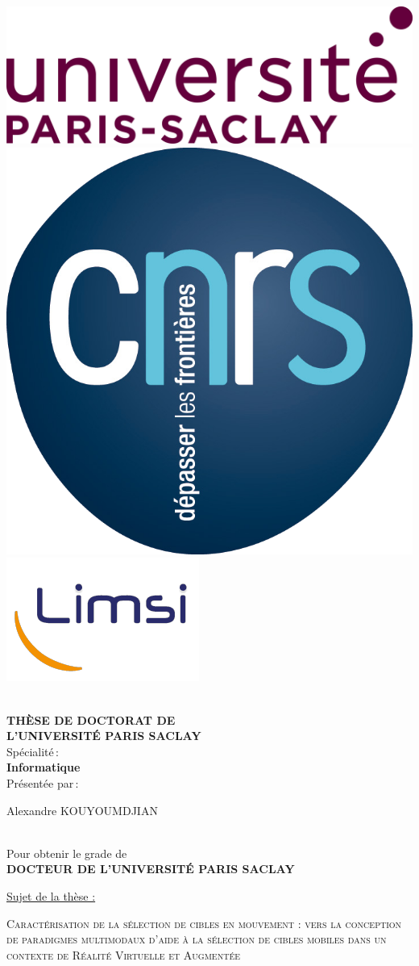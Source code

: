 \begin{titlepage}

\includegraphics[height=2.cm]{./figures/garde/logo_paris_saclay}\hfill
\includegraphics[height=2.cm]{./figures/garde/logo_CNRS}\hfill
\includegraphics[height=2.cm]{./figures/garde/limsilogo_new_transparent_crop}\hfill
\\
\\


\begin{center}
 \textbf{THÈSE DE DOCTORAT DE\\ L'UNIVERSITÉ PARIS SACLAY\\}
Spécialité\,:\\
\textbf{Informatique}\\ 
Présentée par\,:\\ 
\begin{LARGE}
Alexandre KOUYOUMDJIAN\end{LARGE}\\
Pour obtenir le grade de\\
\textbf{DOCTEUR DE L'UNIVERSITÉ PARIS SACLAY}
\end{center}

\noindent \underline{Sujet de la thèse :}\\
\begin{center}
\begin{Large}
{\textsc{Caractérisation de la sélection de cibles en mouvement : vers la conception de paradigmes multimodaux d'aide à la sélection de cibles mobiles dans un contexte de Réalité Virtuelle et Augmentée}}
\end{Large}
\end{center}


\end{titlepage}
